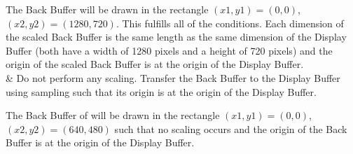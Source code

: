 \begin{libreqtab2}
 \enterexample
 The Back Buffer will be drawn in the rectangle $(x1,y1) = (0,0)$, $(x2,y2) = (1280,720)$. This fulfills all of the conditions. Each dimension of the scaled Back Buffer is the same length as the same dimension of the Display Buffer (both have a width of 1280 pixels and a height of 720 pixels) and the origin of the scaled Back Buffer is at the origin of the Display Buffer.
 \exitexample
 \\
 & Do not perform any scaling. Transfer the Back Buffer to the Display Buffer using sampling such that its origin is at the origin of the Display Buffer.
 
 \enterexample
 The Back Buffer of  will be drawn in the rectangle $(x1,y1) = (0,0)$, $(x2,y2) = (640,480)$ such that no scaling occurs and the origin of the Back Buffer is at the origin of the Display Buffer.
 \exitexample
 \\
\end{libreqtab2}
